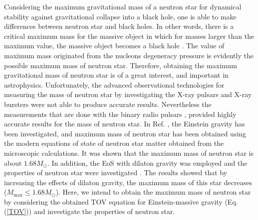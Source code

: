 \documentclass[aps]{revtex4}
\begin{document}
Considering the maximum gravitational mass of a neutron star for dynamical
stability against gravitational collapse into a black hole, one is able to
make differences between neutron star and black holes. In other words, there
is a critical maximum mass for the massive object in which for masses larger
than the maximum value, the massive object becomes a black hole \cite%
{Shapiro}. The value of maximum mass originated from the nucleons degeneracy
pressure is evidently the possible maximum mass of neutron star. Therefore,
obtaining the maximum gravitational mass of neutron star is of a great
interest, and important in astrophysics. Unfortunately, the advanced
observational technologies for measuring the mass of neutron star by
investigating the X-ray pulsars and X-ray bursters were not able to produce
accurate results. Nevertheless the measurements that are done with the
binary radio pulsars \cite{WeisbergT,Liang,HeapC,Quaintrell}, provided
highly accurate results for the mass of neutron star. In Ref. \cite{BordbarH}%
, the Einstein gravity has been investigated, and maximum mass of neutron
star has been obtained using the modern equations of state of neutron star
matter obtained from the microscopic calculations. It was shown that the
maximum mass of neutron star is about $1.68M_{\odot }$. In addition, the EoS
with dilaton gravity was employed and the properties of neutron star were
investigated \cite{Hendi2015}. The results showed that by increasing the
effects of dilaton gravity, the maximum mass of this star decreases ($%
M_{\max }\leq 1.68M_{\odot }$). Here, we intend to obtain the maximum mass
of neutron star by considering the obtained TOV equation for
Einstein-massive gravity (Eq. (\ref{TOV})) and investigate the properties of
neutron star.
\end{document}
